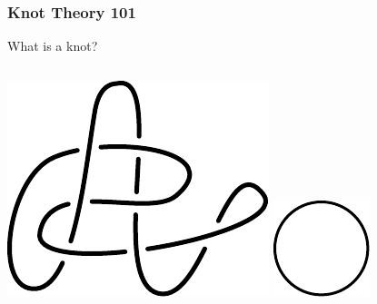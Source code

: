 \documentclass{beamer}
\begin{document}
\begin{frame}
\frametitle{Knot Theory 101}
\begin{block}{}
What is a knot?
\end{block}
\pause
\begin{columns}[c]
\centering
\includegraphics[width=\textwidth]{knot_pix/untrivial-unknot.pdf}
\pause
{}
\includegraphics[width=.8\textwidth]{knot_pix/unknot.pdf}
\end{columns}
\end{frame}
\end{document}
